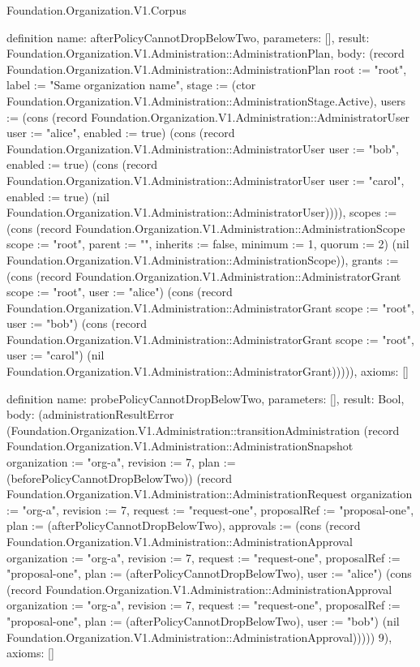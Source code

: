 \begin{lexlean}{Foundation.Organization.V1.Corpus}
\begin{semanticmodule}
definition{
  name: afterPolicyCannotDropBelowTwo,
  parameters: [],
  result: Foundation.Organization.V1.Administration::AdministrationPlan,
  body: (record Foundation.Organization.V1.Administration::AdministrationPlan {root := "root", label := "Same organization name", stage := (ctor Foundation.Organization.V1.Administration::AdministrationStage.Active), users := (cons (record Foundation.Organization.V1.Administration::AdministratorUser {user := "alice", enabled := true}) (cons (record Foundation.Organization.V1.Administration::AdministratorUser {user := "bob", enabled := true}) (cons (record Foundation.Organization.V1.Administration::AdministratorUser {user := "carol", enabled := true}) (nil Foundation.Organization.V1.Administration::AdministratorUser)))), scopes := (cons (record Foundation.Organization.V1.Administration::AdministrationScope {scope := "root", parent := "", inherits := false, minimum := 1, quorum := 2}) (nil Foundation.Organization.V1.Administration::AdministrationScope)), grants := (cons (record Foundation.Organization.V1.Administration::AdministratorGrant {scope := "root", user := "alice"}) (cons (record Foundation.Organization.V1.Administration::AdministratorGrant {scope := "root", user := "bob"}) (cons (record Foundation.Organization.V1.Administration::AdministratorGrant {scope := "root", user := "carol"}) (nil Foundation.Organization.V1.Administration::AdministratorGrant))))}),
  axioms: []
}

definition{
  name: probePolicyCannotDropBelowTwo,
  parameters: [],
  result: Bool,
  body: (administrationResultError (Foundation.Organization.V1.Administration::transitionAdministration (record Foundation.Organization.V1.Administration::AdministrationSnapshot {organization := "org-a", revision := 7, plan := (beforePolicyCannotDropBelowTwo)}) (record Foundation.Organization.V1.Administration::AdministrationRequest {organization := "org-a", revision := 7, request := "request-one", proposalRef := "proposal-one", plan := (afterPolicyCannotDropBelowTwo), approvals := (cons (record Foundation.Organization.V1.Administration::AdministrationApproval {organization := "org-a", revision := 7, request := "request-one", proposalRef := "proposal-one", plan := (afterPolicyCannotDropBelowTwo), user := "alice"}) (cons (record Foundation.Organization.V1.Administration::AdministrationApproval {organization := "org-a", revision := 7, request := "request-one", proposalRef := "proposal-one", plan := (afterPolicyCannotDropBelowTwo), user := "bob"}) (nil Foundation.Organization.V1.Administration::AdministrationApproval)))})) 9),
  axioms: []
}


\end{semanticmodule}
\end{lexlean}
